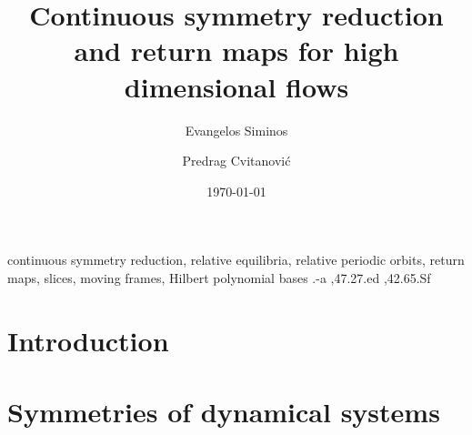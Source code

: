 \documentclass[aps,prl,preprint,superscriptaddress]{revtex4}
\begin{document}
    \ifoldMikTeX %
    \else
{}
\begin{frontmatter}
    \fi          %


			\title{
Continuous symmetry reduction and return maps for high dimensional flows
			}
\author{Evangelos Siminos}
\author{Predrag Cvitanovi\'c}
\address{Center for Nonlinear Science,
School of Physics, Georgia Institute of Technology,
Atlanta, GA 30332-0430}


\date{\today}

\begin{abstract}

\end{abstract}

    \ifoldMikTeX %
    \else
\begin{keyword}
continuous symmetry reduction, 
relative equilibria, 
relative periodic orbits, 
return maps,
slices,
moving frames,
Hilbert polynomial bases
.-a \sep 47.27.ed \sep 42.65.Sf
\end{keyword}
\end{frontmatter}
    \fi %

\section{\label{s:intro} Introduction}
    


\section{\label{s:symDyn} Symmetries of dynamical systems}
    
\end{document}
